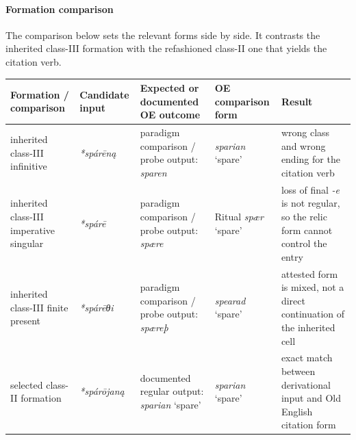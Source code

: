 \documentclass[
  british,
  a4paper,
]{article}
\newcounter{none} %
\providecommand{\Recon}[1]{\emph{*#1}}
\begin{document}
\paragraph{Formation comparison}\label{formation-comparison-4}

The comparison below sets the relevant forms side by side. It contrasts
the inherited class-III formation with the refashioned class-II one that
yields the citation verb.

{\def\LTcaptype{none} %
\begin{longtable}[]{@{}
  >{\raggedright\arraybackslash}p{}
  >{\raggedright\arraybackslash}p{}
  >{\raggedright\arraybackslash}p{}
  >{\raggedright\arraybackslash}p{}
  >{\raggedright\arraybackslash}p{}@{}}
\toprule\noalign{}
\begin{minipage}[b]{\linewidth}\raggedright
Formation / comparison
\end{minipage} & \begin{minipage}[b]{\linewidth}\raggedright
Candidate input
\end{minipage} & \begin{minipage}[b]{\linewidth}\raggedright
Expected or documented OE outcome
\end{minipage} & \begin{minipage}[b]{\linewidth}\raggedright
OE comparison form
\end{minipage} & \begin{minipage}[b]{\linewidth}\raggedright
Result
\end{minipage} \\
\midrule\noalign{}
\endhead
\bottomrule\noalign{}
\endlastfoot
inherited class-III infinitive & {\emph{*spárēną}} & paradigm comparison
/ probe output: {\emph{sparen}} & {\emph{sparian}} `spare' & wrong class
and wrong ending for the citation verb \\
inherited class-III imperative singular & \Recon{spárē} & paradigm
comparison / probe output: {\emph{spære}} & Ritual {\emph{spær}} `spare'
& loss of final \emph{-e} is not regular, so the relic form cannot
control the entry \\
inherited class-III finite present & \Recon{spárēθi} & paradigm
comparison / probe output: {\emph{spæreþ}} & {\emph{spearad}} `spare' &
attested form is mixed, not a direct continuation of the inherited
cell \\
selected class-II formation & {\emph{*spárōjaną}} & documented regular
output: {\emph{sparian}} `spare' & {\emph{sparian}} `spare' & exact
match between derivational input and Old English citation form \\
\end{longtable}
}
\end{document}
